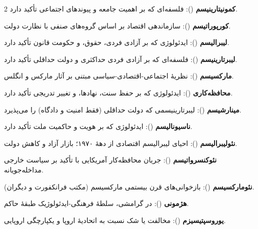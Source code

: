 \begin{multicols}{2}
\textbf{کمونیتارینیسم} (): فلسفه‌ای که بر اهمیت جامعه و پیوندهای اجتماعی تأکید دارد.

\textbf{کورپوراتیسم} (): سازماندهی اقتصاد بر اساس گروه‌های صنفی با نظارت دولت.

\textbf{لیبرالیسم} (): ایدئولوژی که بر آزادی فردی، حقوق، و حکومت قانون تأکید دارد.

\textbf{لیبرتارینیسم} (): فلسفه‌ای که بر آزادی فردی حداکثری و دولت حداقلی تأکید دارد.

\textbf{مارکسیسم} (): نظریهٔ اجتماعی-اقتصادی-سیاسی مبتنی بر آثار مارکس و انگلس.

\textbf{محافظه‌کاری} (): ایدئولوژی که بر حفظ سنت، نهادها، و تغییر تدریجی تأکید دارد.

\textbf{مینارشیسم} (): لیبرتارینیسمی که دولت حداقلی (فقط امنیت و دادگاه) را می‌پذیرد.

\textbf{ناسیونالیسم} (): ایدئولوژی که بر هویت و حاکمیت ملت تأکید دارد.

\textbf{نئولیبرالیسم} (): احیای لیبرالیسم اقتصادی از دهۀ ۱۹۷۰؛ بازار آزاد و کاهش دولت.

\textbf{نئوکنسرواتیسم} (): جریان محافظه‌کار آمریکایی با تأکید بر سیاست خارجی مداخله‌جویانه.

\textbf{نئومارکسیسم} (): بازخوانی‌های قرن بیستمی مارکسیسم (مکتب فرانکفورت و دیگران).

\textbf{هژمونی} (): در گرامشی، سلطهٔ فرهنگی-ایدئولوژیک طبقهٔ حاکم.

\textbf{یوروسپتیسیزم} (): مخالفت یا شک نسبت به اتحادیهٔ اروپا و یکپارچگی اروپایی.


\end{multicols}